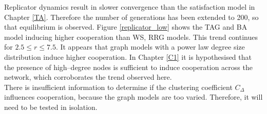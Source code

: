 Replicator dynamics result in slower convergence than the satisfaction model in Chapter \ref{TA}. Therefore the number of generations has been extended to 200, so that equilibrium is observed. Figure \ref{replicator_low} shows the TAG and BA model inducing higher cooperation than WS, RRG models. This trend continues for $2.5 \leq r \leq 7.5$. It appears that graph models with a power law degree size distribution induce higher cooperation. In Chapter \ref{C1} it is hypothesised that the presence of high--degree nodes is sufficient to induce cooperation across the network, which corroborates the trend observed here. \\

There is insufficient information to determine if the clustering coefficient $C_\Delta$ influences cooperation, because the graph models are too varied. Therefore, it will need to be tested in isolation.\\

